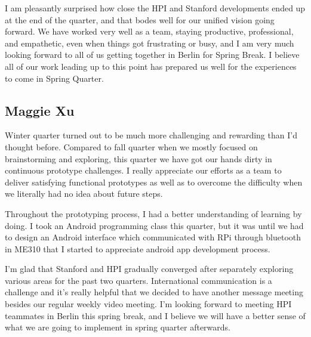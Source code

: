 I am pleasantly surprised how close the HPI and Stanford developments ended up at the end of the quarter, and that bodes well for our unified vision going forward. We have worked very well as a team, staying productive, professional, and empathetic, even when things got frustrating or busy, and I am very much looking forward to all of us getting together in Berlin for Spring Break. I believe all of our work leading up to this point has prepared us well for the experiences to come in Spring Quarter.


\subsection*{Maggie Xu}
Winter quarter turned out to be much more challenging and rewarding than I'd thought before. Compared to fall quarter when we mostly focused on brainstorming and exploring, this quarter we have got our hands dirty in continuous prototype challenges. I really appreciate our efforts as a team to deliver satisfying functional prototypes as well as to overcome the difficulty when we literally had no idea about future steps. 

Throughout the prototyping process, I had a better understanding of learning by doing. I took an Android programming class this quarter, but it was until we had to design an Android interface which communicated with RPi through bluetooth in ME310 that I started to appreciate android app development process. 

I'm glad that Stanford and HPI gradually converged after separately exploring various areas for the past two quarters. International communication is a challenge and it's really helpful that we decided to have another message meeting besides our regular weekly video meeting. I'm looking forward to meeting HPI teammates in Berlin this spring break, and I believe we will have a better sense of what we are going to implement in spring quarter afterwards.


